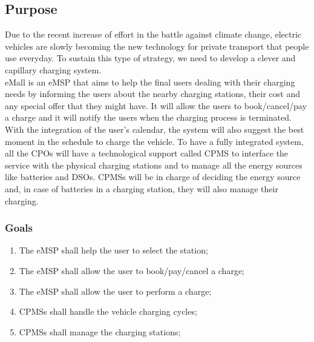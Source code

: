 


\subsection{Purpose}
Due to the recent increase of effort in the battle against climate change, electric vehicles are slowly becoming the new technology for private transport that   people use everyday.
To sustain this type of strategy, we need to develop a clever and capillary charging system.\\
\ac{eMall} is an \ac{eMSP} that aims to help the final users dealing with their charging needs by informing the users about the nearby charging stations, their cost and any special offer that they might have.
It will allow the users to book/cancel/pay a charge and it will notify the users when the charging process is terminated.\\
With the integration of the user's calendar, the system will also suggest the best moment in the schedule to charge the vehicle.
To have a fully integrated system, all the \acp{CPO} will have a technological support called \ac{CPMS} to interface the service with the physical charging stations and to manage all the energy sources like batteries and \acp{DSO}.
\acp{CPMS} will be in charge of deciding the energy source and, in case of batteries in a charging station, they will also manage their charging.
\subsubsection{Goals}
%
\begin{enumerate}[label=\textbf{G\arabic*}]
    \item The \ac{eMSP} shall help the user to select the station;\label{goal:eMSP-helps-selecting}
    \item The \ac{eMSP} shall allow the user to book/pay/cancel a charge;\label{goal:eMSP-booking-charge}
    \item The \ac{eMSP} shall allow the user to perform a charge;\label{goal:eMSP-allow-charge}
    \item \acp{CPMS} shall handle the vehicle charging cycles;\label{goal:CPMS-handles-charge}
    \item \acp{CPMS} shall manage the charging stations;\label{goal:CPMS-manage-station}
\end{enumerate}

